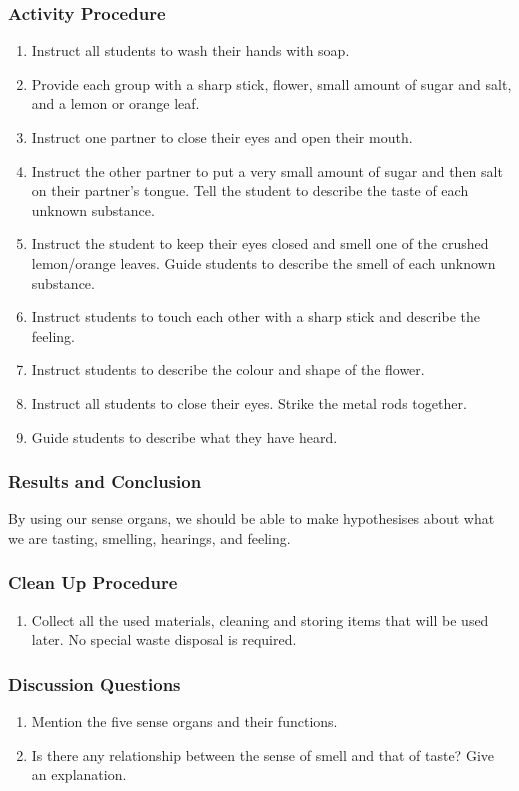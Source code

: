 \subsubsection*{Activity Procedure}
\begin{enumerate}
\item{Instruct all students to wash their hands with soap.}
\item{Provide each group with a sharp stick, flower, small amount of sugar and salt, and a lemon or orange leaf.}
\item{Instruct one partner to close their eyes and open their mouth.}
\item{Instruct the other partner to put a very small amount of sugar and then salt on their partner's tongue. Tell the student to describe the taste of each unknown substance.}
\item{Instruct the student to keep their eyes closed and smell one of the crushed lemon/orange leaves. Guide students to describe the smell of each unknown substance.}
\item{Instruct students to touch each other with a sharp stick and describe the feeling.}
\item{Instruct students to describe the colour and shape of the flower.}
\item{Instruct all students to close their eyes. Strike the metal rods together.}
\item{Guide students to describe what they have heard.}
\end{enumerate}

\subsubsection*{Results and Conclusion}
By using our sense organs, we should be able to make hypothesises about what we are tasting, smelling, hearings, and feeling.

\subsubsection*{Clean Up Procedure}
\begin{enumerate}
\item{Collect all the used materials, cleaning and storing items that will be used later. No special waste disposal is required.}
\end{enumerate}

\subsubsection*{Discussion Questions}
\begin{enumerate}
\item{Mention the five sense organs and their functions.}
\item{Is there any relationship between the sense of smell and that of taste? Give an explanation.}
\end{enumerate}